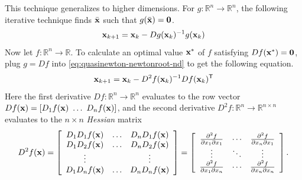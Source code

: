 This technique generalizes to higher dimensions.
For $g:\mathbb{R}^n \rightarrow \mathbb{R}^n$, the following iterative technique finds $\bar{\mathbf{x}}$ such that $g(\bar{\mathbf{x}}) = \mathbf{0}$.
\begin{equation}
\mathbf{x}_{k+1} = \mathbf{x}_k - Dg(\mathbf{x}_k)^{-1}g(\mathbf{x}_k)
\label{eq:quasinewton-newtonroot-nd}
\end{equation}
Now let $f:\mathbb{R}^n\rightarrow\mathbb{R}$.
To calculate an optimal value $\mathbf{x}^*$ of $f$ satisfying $Df(\mathbf{x}^*) = \mathbf{0}$, plug $g = Df$ into \eqref{eq:quasinewton-newtonroot-nd} to get the following equation.
\begin{equation}
\mathbf{x}_{k+1} = \mathbf{x}_k - D^2f(\mathbf{x}_k)^{-1}Df(\mathbf{x}_k)^{\mathsf T}
\label{eq:quasinewton-newton-nd}
\end{equation}
Here the first derivative $Df:\mathbb{R}^n\rightarrow\mathbb{R}^n$ evaluates to the row vector $Df(\mathbf{x}) = [D_{1}f(\mathbf{x})\ \ldots\ D_{n}f(\mathbf{x})]$,
and the second derivative $D^2f:\mathbb{R}^n\rightarrow\mathbb{R}^{n\times n}$ evaluates to the $n\times n$ \emph{Hessian} matrix
\[
D^2f(\mathbf{x}) =
\left[\begin{array}{ccc}
D_1 D_1 f(\mathbf{x}) & \ldots & D_n D_1 f(\mathbf{x}) \\
D_1 D_2 f(\mathbf{x}) & \ldots & D_n D_2 f(\mathbf{x}) \\
\vdots        &        & \vdots        \\
D_1 D_n f(\mathbf{x}) & \ldots & D_n D_n f(\mathbf{x})
\end{array}\right]
=
\left[\begin{array}{ccc}
\frac{\partial^2 f}{\partial x_1 \partial x_1} & \cdots & \frac{\partial^2 f}{\partial x_n \partial x_1} \\
\vdots & \ddots & \vdots \\
\frac{\partial^2 f}{\partial x_1 \partial x_n} & \cdots & \frac{\partial^2 f}{\partial x_n \partial x_n}
\end{array}\right].
\]

